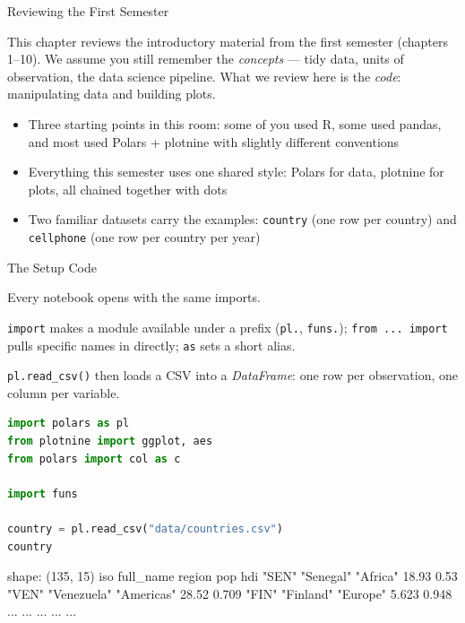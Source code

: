 \documentclass[8pt,aspectratio=169]{beamer}
\begin{document}
\begin{textframe}{Reviewing the First Semester}

This chapter reviews the introductory material from the first semester (chapters 1--10). We assume you still remember the \textit{concepts} --- tidy data, units of observation, the data science pipeline. What we review here is the \textit{code}: manipulating data and building plots.

\begin{itemize}
\item Three starting points in this room: some of you used R, some used pandas, and most used Polars + plotnine with slightly different conventions
\item Everything this semester uses one shared style: Polars for data, plotnine for plots, all chained together with dots
\item Two familiar datasets carry the examples: \texttt{country} (one row per country) and \texttt{cellphone} (one row per country per year)
\end{itemize}

\end{textframe}

\begin{frame}[fragile]{The Setup Code}
\begin{splitcode}{%

Every notebook opens with the same imports.

\texttt{import} makes a module available under a prefix (\texttt{pl.}, \texttt{funs.}); \texttt{from ... import} pulls specific names in directly; \texttt{as} sets a short alias.

\texttt{pl.read\_csv()} then loads a CSV into a \textit{DataFrame}: one row per observation, one column per variable.

}
\begin{lstlisting}[language=Python]
import polars as pl
from plotnine import ggplot, aes
from polars import col as c

import funs

country = pl.read_csv("data/countries.csv")
country
\end{lstlisting}
\begin{codeoutput}
shape: (135, 15)
iso    full_name    region      pop    hdi
"SEN"  "Senegal"    "Africa"    18.93  0.53
"VEN"  "Venezuela"  "Americas"  28.52  0.709
"FIN"  "Finland"    "Europe"    5.623  0.948
...    ...          ...         ...    ...
\end{codeoutput}
\end{splitcode}
\end{frame}
\end{document}
